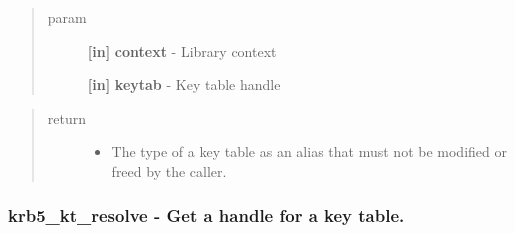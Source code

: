 \documentclass[letterpaper,10pt,english]{sphinxmanual}
\begin{document}
\begin{quote}\begin{description}
\item[{param}] \leavevmode
\textbf{{[}in{]}} \textbf{context} - Library context

\textbf{{[}in{]}} \textbf{keytab} - Key table handle

\end{description}\end{quote}
\begin{quote}\begin{description}
\item[{return}] \leavevmode\begin{itemize}
\item {} 
The type of a key table as an alias that must not be modified or freed by the caller.

\end{itemize}

\end{description}\end{quote}


\subsubsection{krb5\_kt\_resolve -  Get a handle for a key table.}
\label{appdev/refs/api/krb5_kt_resolve:krb5-kt-resolve-get-a-handle-for-a-key-table}\label{appdev/refs/api/krb5_kt_resolve::doc}

\begin{fulllineitems}
\label{appdev/refs/api/krb5_kt_resolve:c.krb5_kt_resolve}
\end{fulllineitems}
\end{document}
